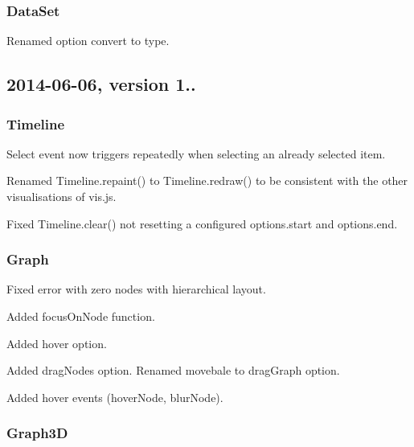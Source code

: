 \subsubsection*{Data\+Set}


\begin{DoxyItemize}
\item Renamed option {\ttfamily convert} to {\ttfamily type}.
\end{DoxyItemize}

\subsection*{2014-\/06-\/06, version 1..}

\subsubsection*{Timeline}


\begin{DoxyItemize}
\item Select event now triggers repeatedly when selecting an already selected item.
\item Renamed {\ttfamily Timeline.\+repaint()} to {\ttfamily Timeline.\+redraw()} to be consistent with the other visualisations of vis.\+js.
\item Fixed {\ttfamily Timeline.\+clear()} not resetting a configured {\ttfamily options.\+start} and {\ttfamily options.\+end}.
\end{DoxyItemize}

\subsubsection*{Graph}


\begin{DoxyItemize}
\item Fixed error with zero nodes with hierarchical layout.
\item Added focus\+On\+Node function.
\item Added hover option.
\item Added drag\+Nodes option. Renamed movebale to drag\+Graph option.
\item Added hover events (hover\+Node, blur\+Node).
\end{DoxyItemize}

\subsubsection*{Graph3D}


